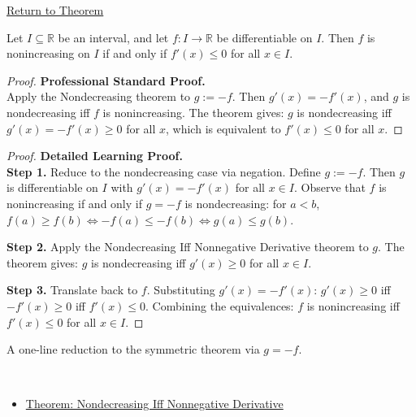 \newpage
{}
\label{prf:nonincreasing-iff-nonpos-derivative}

\begin{remark*}[Return]
\hyperref[thm:nonincreasing-iff-nonpos-derivative]{Return to Theorem}
\end{remark*}

\begin{theorem*}
Let $I \subseteq \mathbb{R}$ be an interval, and let $f : I \to \mathbb{R}$ be differentiable on $I$. Then $f$ is nonincreasing on $I$ if and only if $f'(x) \leq 0$ for all $x \in I$.
\end{theorem*}

\begin{proof}
\textbf{Professional Standard Proof.}~\\
Apply the Nondecreasing theorem to $g := -f$. Then $g'(x) = -f'(x)$, and $g$ is nondecreasing iff $f$ is nonincreasing. The theorem gives: $g$ is nondecreasing iff $g'(x) = -f'(x) \geq 0$ for all $x$, which is equivalent to $f'(x) \leq 0$ for all $x$.
\end{proof}

\begin{proof}
\textbf{Detailed Learning Proof.}~\\

\textbf{Step 1.} Reduce to the nondecreasing case via negation. Define $g := -f$. Then $g$ is differentiable on $I$ with $g'(x) = -f'(x)$ for all $x \in I$. Observe that $f$ is nonincreasing if and only if $g = -f$ is nondecreasing: for $a < b$, $f(a) \geq f(b) \iff -f(a) \leq -f(b) \iff g(a) \leq g(b)$.

\textbf{Step 2.} Apply the Nondecreasing Iff Nonneg\-ative Derivative theorem to $g$. The theorem gives: $g$ is nondecreasing iff $g'(x) \geq 0$ for all $x \in I$.

\textbf{Step 3.} Translate back to $f$. Substituting $g'(x) = -f'(x)$: $g'(x) \geq 0$ iff $-f'(x) \geq 0$ iff $f'(x) \leq 0$. Combining the equivalences: $f$ is nonincreasing iff $f'(x) \leq 0$ for all $x \in I$.
\end{proof}

\begin{remark*}
A one-line reduction to the symmetric theorem via $g = -f$.
\end{remark*}

\begin{remark*}[Dependencies]~\\
\begin{itemize}
  \item \hyperref[thm:nondecreasing-iff-nonneg-derivative]{Theorem: Nondecreasing Iff Nonneg\-ative Derivative}
\end{itemize}
\end{remark*}
